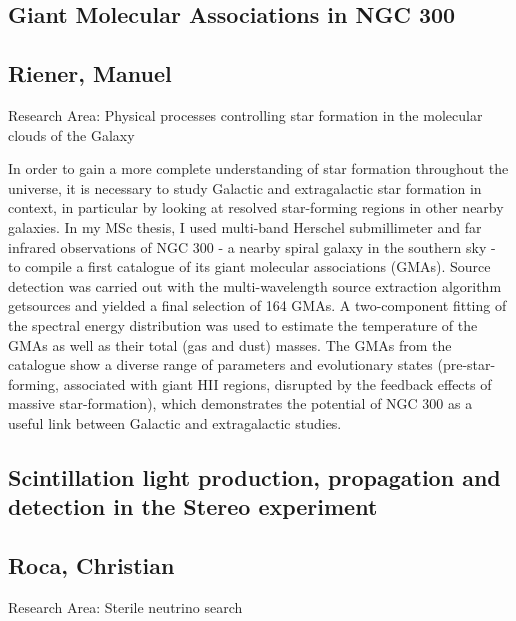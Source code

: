 \subsection*{\centering \large Giant Molecular Associations in NGC 300}
\subsection*{\centering \normalsize Riener, Manuel}
Research Area: Physical processes controlling star formation in the molecular clouds of the Galaxy\newline

\noindent In order to gain a more complete understanding of star formation throughout the universe, it is necessary to study Galactic and extragalactic star formation in context, in particular by looking at resolved star-forming regions in other nearby galaxies. In my MSc thesis, I used multi-band Herschel submillimeter and far infrared observations of NGC 300 - a nearby spiral galaxy in the southern sky - to compile a first catalogue of its giant molecular associations (GMAs). Source detection was carried out with the multi-wavelength source extraction algorithm getsources and yielded a final selection of 164 GMAs. A two-component fitting of the spectral energy distribution was used to estimate the temperature of the GMAs as well as their total (gas and dust) masses. The GMAs from the catalogue show a diverse range of parameters and evolutionary states (pre-star-forming, associated with giant HII regions, disrupted by the feedback effects of massive star-formation), which demonstrates the potential of NGC 300 as a useful link between Galactic and extragalactic studies.

\subsection*{\centering \large Scintillation light production, propagation and detection in the Stereo experiment}
\subsection*{\centering \normalsize Roca, Christian}
Research Area: \newline Sterile neutrino search

